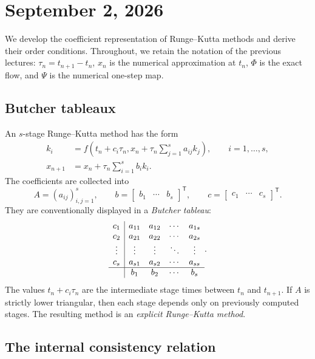 \section{September 2, 2026}

We develop the coefficient representation of Runge--Kutta methods and
derive their order conditions. Throughout, we retain the notation of
the previous lectures: \(\tau_n=t_{n+1}-t_n\), \(x_n\) is the numerical
approximation at \(t_n\), \(\Phi\) is the exact flow, and \(\Psi\) is
the numerical one-step map.

\subsection{Butcher tableaux}

An \(s\)-stage Runge--Kutta method has the form
\begin{align}
  k_i
  &=f\left(t_n+c_i\tau_n,
    x_n+\tau_n\sum_{j=1}^s a_{ij}k_j\right),
    \qquad i=1,\ldots,s,
    \label{eq:rk-stages-sep-02}\\
  x_{n+1}
  &=x_n+\tau_n\sum_{i=1}^s b_i k_i.
    \label{eq:rk-update-sep-02}
\end{align}
The coefficients are collected into
\[
  A=(a_{ij})_{i,j=1}^s,
  \qquad
  b=\begin{bmatrix}b_1&\cdots&b_s\end{bmatrix}^{\mathsf T},
  \qquad
  c=\begin{bmatrix}c_1&\cdots&c_s\end{bmatrix}^{\mathsf T}.
\]
They are conventionally displayed in a \emph{Butcher tableau}:
\[
  \begin{array}{c|cccc}
    c_1&a_{11}&a_{12}&\cdots&a_{1s}\\
    c_2&a_{21}&a_{22}&\cdots&a_{2s}\\
    \vdots&\vdots&\vdots&\ddots&\vdots\\
    c_s&a_{s1}&a_{s2}&\cdots&a_{ss}\\ \hline
       &b_1&b_2&\cdots&b_s
  \end{array}.
\]
The values \(t_n+c_i\tau_n\) are the intermediate stage times between
\(t_n\) and \(t_{n+1}\). If \(A\) is strictly lower triangular, then
each stage depends only on previously computed stages. The resulting
method is an \emph{explicit Runge--Kutta method}.

\subsection{The internal consistency relation}

